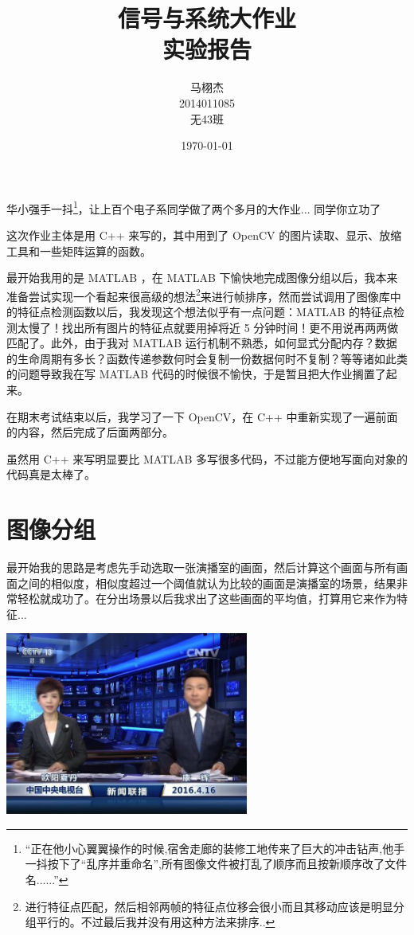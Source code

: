 \documentclass[a4paper, fontset=none]{article}
\title{信号与系统大作业\\实验报告}
\author{马栩杰\\2014011085\\无43班}
\date{\today}
\begin{document}
\maketitle

华小强手一抖\footnote{``正在他小心翼翼操作的时候,宿舍走廊的装修工地传来了巨大的冲击钻声,他手一抖按下了“乱序并重命名”,所有图像文件被打乱了顺序而且按新顺序改了文件名......''}，让上百个电子系同学做了两个多月的大作业... 同学你立功了 \smiley

这次作业主体是用 C++ 来写的，其中用到了 OpenCV 的图片读取、显示、放缩工具和一些矩阵运算的函数。

最开始我用的是 MATLAB ，在 MATLAB 下愉快地完成图像分组以后，我本来准备尝试实现一个看起来很高级的想法\footnote{进行特征点匹配，然后相邻两帧的特征点位移会很小而且其移动应该是明显分组平行的。不过最后我并没有用这种方法来排序..}来进行帧排序，然而尝试调用了图像库中的特征点检测函数以后，我发现这个想法似乎有一点问题：MATLAB 的特征点检测太慢了！找出所有图片的特征点就要用掉将近 5 分钟时间！更不用说再两两做匹配了。此外，由于我对 MATLAB 运行机制不熟悉，如何显式分配内存？数据的生命周期有多长？函数传递参数何时会复制一份数据何时不复制？等等诸如此类的问题导致我在写 MATLAB 代码的时候很不愉快，于是暂且把大作业搁置了起来。

在期末考试结束以后，我学习了一下 OpenCV，在 C++ 中重新实现了一遍前面的内容，然后完成了后面两部分。

虽然用 C++ 来写明显要比 MATLAB 多写很多代码，不过能方便地写面向对象的代码真是太棒了。

\section{图像分组}
\label{sec:图像分组}

最开始我的思路是考虑先手动选取一张演播室的画面，然后计算这个画面与所有画面之间的相似度，相似度超过一个阈值就认为比较的画面是演播室的场景，结果非常轻松就成功了。在分出场景以后我求出了这些画面的平均值，打算用它来作为特征...

\begin{center}
  \includegraphics[width=0.6\textwidth]{./indoor_average.jpg}
\end{center}
\end{document}
